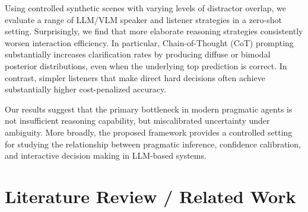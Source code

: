 \documentclass[11pt]{article}
\begin{document}
Using controlled synthetic scenes with varying levels of distractor overlap, we evaluate a range of LLM/VLM speaker and listener strategies in a zero-shot setting. Surprisingly, we find that more elaborate reasoning strategies consistently worsen interaction efficiency. In particular, Chain-of-Thought (CoT) prompting substantially increases clarification rates by producing diffuse or bimodal posterior distributions, even when the underlying top prediction is correct. In contrast, simpler listeners that make direct hard decisions often achieve substantially higher cost-penalized accuracy.

Our results suggest that the primary bottleneck in modern pragmatic agents is not insufficient reasoning capability, but miscalibrated uncertainty under ambiguity. More broadly, the proposed framework provides a controlled setting for studying the relationship between pragmatic inference, confidence calibration, and interactive decision making in LLM-based systems.

\section{Literature Review / Related Work}

\end{document}
